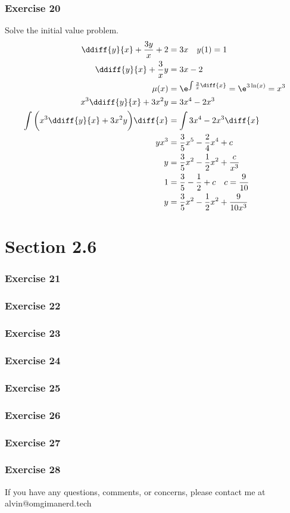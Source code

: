\documentclass{math}
\begin{document}
\subsubsection*{Exercise 20}
Solve the initial value problem.
\begin{align*}
  \ddiff{y}{x}+\frac{3y}{x}+2 &= 3x \quad y(1) = 1 \\
  \ddiff{y}{x}+\frac{3}{x}y &= 3x-2 \\
  \mu(x) &= \e^{\int\frac{3}{x}\diff{x}} = \e^{3\ln(x)} = x^3 \\
  x^3\ddiff{y}{x}+3x^2y &= 3x^4-2x^3 \\
  \int\bigg(x^3\ddiff{y}{x}+3x^2y\bigg)\diff{x} &= \int3x^4-2x^3\diff{x} \\
  yx^3 &= \frac{3}{5}x^5-\frac{2}{4}x^4+c \\
  y &= \frac{3}{5}x^2-\frac{1}{2}x^2+\frac{c}{x^3} \\
  1 &= \frac{3}{5}-\frac{1}{2}+c \quad c = \frac{9}{10} \\
  y &= \frac{3}{5}x^2-\frac{1}{2}x^2+\frac{9}{10x^3} \\
\end{align*}

\section*{Section 2.6}

\subsubsection*{Exercise 21}
\subsubsection*{Exercise 22}
\subsubsection*{Exercise 23}
\subsubsection*{Exercise 24}
\subsubsection*{Exercise 25}
\subsubsection*{Exercise 26}
\subsubsection*{Exercise 27}
\subsubsection*{Exercise 28}

\begin{center}
  If you have any questions, comments, or concerns, please contact me at
  alvin@omgimanerd.tech
\end{center}
\end{document}
